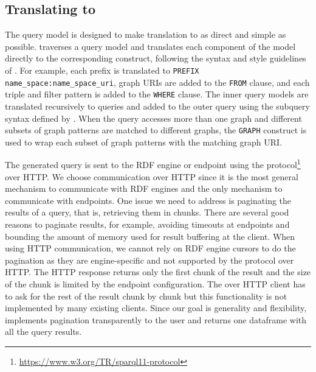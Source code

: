 \subsection{Translating to \sparql}
\begin{sloppypar}
The query model is designed to make translation to \sparql as direct and simple as possible. \rdfframes traverses a query model and translates each component of the model directly to the corresponding \sparql construct, following the syntax and style guidelines of \sparql.
For example, each prefix is translated to \texttt{PREFIX name\_space:name\_space\_uri}, graph URIs are added to the \texttt{FROM} clause, and each triple and filter pattern is added to the \texttt{WHERE} clause. The inner query models are translated recursively to \sparql queries and added to the outer query using the subquery syntax defined by \sparql.
When the query accesses more than one graph and different subsets of graph patterns are matched to different graphs, the \texttt{GRAPH} construct is used to wrap each subset of graph patterns with the matching graph URI. 
\end{sloppypar}

The generated \sparql query is sent to the RDF engine or \sparql endpoint using 
the \sparql protocol\footnote{\url{https://www.w3.org/TR/sparql11-protocol}} over HTTP.
We choose communication over HTTP since it is the most general mechanism to communicate with RDF engines and the only mechanism to communicate with \sparql endpoints.
One issue we need to address is paginating the results of a query, that is, retrieving them in chunks. There are several good reasons to paginate results, for example, avoiding timeouts at \sparql endpoints and bounding the amount of memory used for result buffering at the client. When using HTTP communication, we cannot rely on RDF engine cursors to do the pagination as they are engine-specific and not supported by the \sparql protocol over HTTP. The HTTP response returns only the first chunk of the result and the size of the chunk is limited by the \sparql endpoint configuration. The \sparql over HTTP client has to ask for the rest of the result chunk by chunk but this functionality is not implemented by many existing clients. %
Since our goal is generality and flexibility, \rdfframes implements pagination 
transparently to the user and returns one dataframe with all the query results.